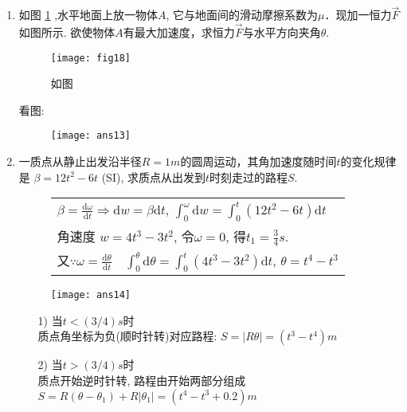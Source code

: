 \begin{enumerate}
     \item 如图 \ref{Fig:18} ,水平地面上放一物体$A$, 它与地面间的滑动摩擦系数为$\mu$．现加一恒力$\vec{F}$如图所示. 欲使物体$A$有最大加速度，求恒力$\vec{F}$与水平方向夹角$\theta$.
     \begin{figure}[H]
        \centering
        \texttt{[image: fig18]}
            \caption{如图}\label{Fig:18}
    \end{figure}
    \begin{solution}
        看图: 
        \begin{figure}[H]
            \centering
            \texttt{[image: ans13]}
        \end{figure}
    \end{solution}
    \item 一质点从静止出发沿半径$R=1m$的圆周运动，其角加速度随时间$t$的变化规律是 $\beta = 12t^2-6t$ (SI), 求质点从出发到$t$时刻走过的路程$S$.
    \begin{solution}

        \begin{figure}[ht]
            \begin{minipage}[ht]{0.7\linewidth}
                \begin{table}[H]
                    \begin{tabular}{l}
                       \qquad $\beta = \frac{\mathrm{d}\omega}{\mathrm{d}t}\Longrightarrow \mathrm{d}w=\beta \mathrm{d}t$, $\displaystyle{\int_0^\omega \mathrm{d}w = \int_0^t(12t^2-6t)\mathrm{d}t}$\\
                        
                       \qquad 角速度 $w = 4t^3-3t^2$, 令$\omega = 0$, 得$t_1=\frac{3}{4}s$. \\
                       \qquad 又$\because \omega = \frac{\mathrm{d}\theta}{\mathrm{d}t}$\ \ $\displaystyle{\int_0^{\theta}\mathrm{d}\theta = \displaystyle{\int_0^t(4t^3-3t^2)\mathrm{d}t}}$, 
                $\theta = t^4-t^3$
                    \end{tabular}
                \end{table}
            \end{minipage}
            \begin{minipage}[H]{0.25\linewidth}
                \texttt{[image: ans14]}
            \end{minipage}
        \end{figure}
        \begin{enumerate}
            \item[1)] 当$t<(3/4)s$时\\
            质点角坐标为负(顺时针转)对应路程: $S=|R\theta|=(t^3-t^4) m$
            \item[2)] 当$t>(3/4)s$时\\
            质点开始逆时针转, 路程由开始两部分组成 $S=R(\theta-\theta_1)+R|\theta_1|= (t^4-t^3+0.2) m$
        \end{enumerate}
    \end{solution}    
\end{enumerate}